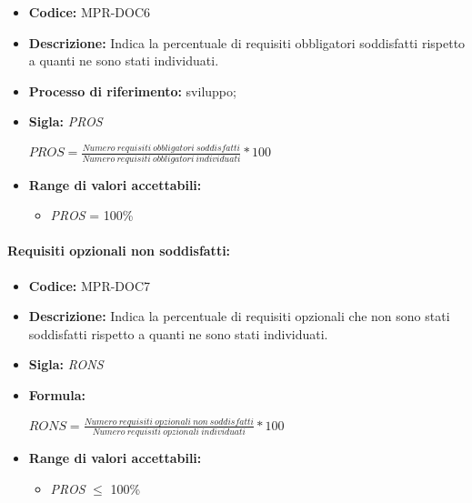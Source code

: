  \begin{itemize}
    \item \textbf{Codice:} MPR-DOC6
    \item \textbf{Descrizione:} Indica la percentuale di requisiti obbligatori soddisfatti rispetto a quanti ne sono stati individuati.
    \item \textbf{Processo di riferimento:} sviluppo;
    \item \textbf{Sigla:} \textit{PROS}
  
    
    \begin{center}
        \(PROS = \frac{Numero\ requisiti\ obbligatori\ soddisfatti}{Numero\ requisiti\  obbligatori\ individuati}*100\)
    \end{center}

    \item \textbf{Range di valori accettabili:}
    \begin{itemize}
        \item  \textit{PROS} = 100\%
    \end{itemize}
\end{itemize}
    
  
\paragraph{Requisiti opzionali non soddisfatti:}
  \begin{itemize}
    \item \textbf{Codice:} MPR-DOC7
    \item \textbf{Descrizione:} Indica la percentuale di requisiti opzionali che non sono stati soddisfatti rispetto a quanti ne sono stati individuati.
    \item \textbf{Sigla:} \textit{RONS}
    \item \textbf{Formula:}
    \begin{center}
        \(RONS=\frac{Numero\ requisiti\ opzionali\ non\ soddisfatti}{Numero\ requisiti\  opzionali\ individuati}*100\)
    \end{center}
    \item \textbf{Range di valori accettabili:}
    \begin{itemize}
        \item \textit{PROS} $\leq$ 100\%
    
    \end{itemize}
\end{itemize}


